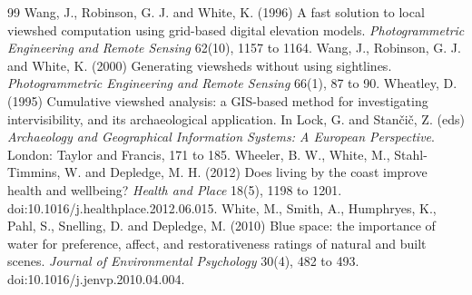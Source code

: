 \documentclass[11pt,a4paper]{article}
\begin{document}
\begin{thebibliography}{99}
 Wang, J., Robinson, G. J. and White, K. (1996) A fast solution to local viewshed computation using grid-based digital elevation models. \textit{Photogrammetric Engineering and Remote Sensing} 62(10), 1157 to 1164.
 Wang, J., Robinson, G. J. and White, K. (2000) Generating viewsheds without using sightlines. \textit{Photogrammetric Engineering and Remote Sensing} 66(1), 87 to 90.
 Wheatley, D. (1995) Cumulative viewshed analysis: a GIS-based method for investigating intervisibility, and its archaeological application. In Lock, G. and Stan\v{c}i\v{c}, Z. (eds) \textit{Archaeology and Geographical Information Systems: A European Perspective}. London: Taylor and Francis, 171 to 185.
 Wheeler, B. W., White, M., Stahl-Timmins, W. and Depledge, M. H. (2012) Does living by the coast improve health and wellbeing? \textit{Health and Place} 18(5), 1198 to 1201. doi:10.1016/j.healthplace.2012.06.015.
 White, M., Smith, A., Humphryes, K., Pahl, S., Snelling, D. and Depledge, M. (2010) Blue space: the importance of water for preference, affect, and restorativeness ratings of natural and built scenes. \textit{Journal of Environmental Psychology} 30(4), 482 to 493. doi:10.1016/j.jenvp.2010.04.004.
\end{thebibliography}

\appendix
\end{document}
